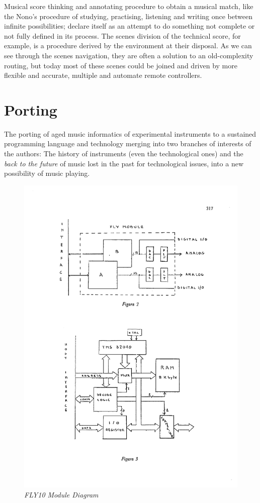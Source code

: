 \documentclass[twoside,a4paper]{article}
\begin{document}
Musical score thinking and annotating procedure to obtain a musical match, like the Nono's procedure of studying, practising, listening and writing once between infinite possibilities; declare itself as an attempt to do something not complete or not fully defined in its process. The scenes division of the technical score, for example, is a procedure derived by the environment at their disposal. As we can see through the scenes navigation, they are often a solution to an old-complexity routing, but today most of these scenes could be joined and driven by more flexible and accurate, multiple and automate remote controllers. 



\section{Porting}
\label{sec:porting}

The porting of aged music informatics of experimental instruments to a sustained programming language and technology merging into two branches of interests of the authors: The history of instruments (even the technological ones) and the \emph{back to the future} of music lost in the past for technological issues, into a new possibility of music playing. 

\begin{figure}[ht]
\centerline{\includegraphics[width=.45\textwidth]{img/lmfly10}}
\caption{\label{ml-fly10}{\it FLY10 Module Diagram}}
\end{figure}
\end{document}
